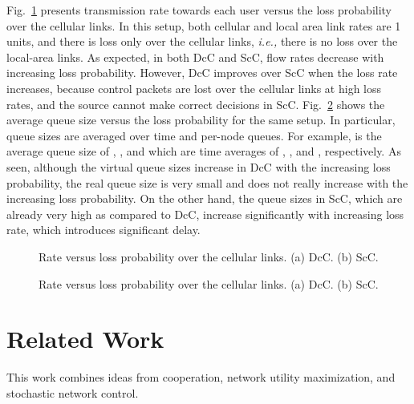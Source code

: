 \documentclass[conference]{IEEEtran}
\newcommand{\ie}{{\em i.e., }}
\begin{document}
Fig.~\ref{fig:sims_rateVsCellularLoss} presents transmission rate towards each user versus the loss probability over the cellular links.  In this setup, both cellular and local area link rates are 1 units, and there is loss only over the cellular links, \ie there is no loss over the local-area links. As expected, in both DcC and ScC, flow rates decrease with increasing loss probability. However, DcC improves over ScC when the loss rate increases, because control packets are lost over the cellular links at high loss rates, and the source cannot make correct decisions in ScC. Fig.~\ref{fig:sims_avgQueueSizeVsCellularLoss} shows the average queue size versus the loss probability for the same setup. In particular, queue sizes are averaged over time and per-node queues. For example,  is the average queue size of , , and  which are time averages of , , and , respectively. As seen, although the virtual queue sizes increase in DcC with the increasing loss probability, the real queue size  is very small and does not really increase with the increasing loss probability. On the other hand, the queue sizes in ScC, which are already very high as compared to DcC, increase significantly with increasing loss rate, which introduces significant delay.

\begin{figure}[t!]
\centering
{}
\vspace{-5pt}
\caption{ Rate versus loss probability over the cellular links. (a) DcC. (b) ScC.}
\vspace{-5pt}
\label{fig:sims_rateVsCellularLoss}
\end{figure}


\begin{figure}[t!]
\centering
{}
\vspace{-5pt}
\caption{ Rate versus loss probability over the cellular links. (a) DcC. (b) ScC.}
\vspace{-5pt}
\label{fig:sims_avgQueueSizeVsCellularLoss}
\end{figure}

\section{\label{sec:related} Related Work}
This work combines ideas from cooperation, network utility maximization, and stochastic network control.
\end{document}
